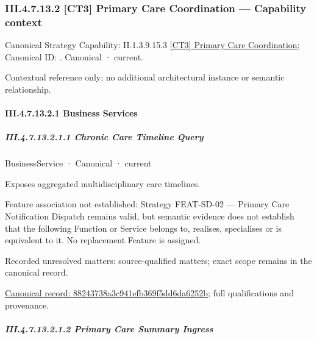 \subsubsection*{III.4.7.13.2 [CT3] Primary Care Coordination — Capability context}
\label{navigation:III.4.7.13.2}

{\small Canonical Strategy Capability: II.1.3.9.15.3 \hyperref[element:f80e73ee91624ce5baa11ae15480fd35]{[CT3] Primary Care Coordination}; Canonical ID: \texttt{}. Canonical · current.}\par
Contextual reference only; no additional architectural instance or semantic relationship.\par
\paragraph*{III.4.7.13.2.1 Business Services}
\label{navigation:III.4.7.13.2.1}

\subparagraph*{III.4.7.13.2.1.1 Chronic Care Timeline Query}
\label{navigation:III.4.7.13.2.1.1}

\label{element:88243738a3c941efb369f5dd6da6252b}
{\small BusinessService · Canonical · current}\par

Exposes aggregated multidisciplinary care timelines.



Feature association not established: Strategy FEAT-SD-02 — Primary Care Notification Dispatch remains valid, but semantic evidence does not establish that the following Function or Service belongs to, realises, specialises or is equivalent to it. No replacement Feature is assigned.


{\small Recorded unresolved matters: source-qualified matters; exact scope remains in the canonical record.}\par
{\footnotesize \href{../../../../continuum/business/business-service/88243738a3c941efb369f5dd6da6252b.md}{Canonical record: 88243738a3c941efb369f5dd6da6252b}; full qualifications and provenance.}\par
\subparagraph*{III.4.7.13.2.1.2 Primary Care Summary Ingress}
\label{navigation:III.4.7.13.2.1.2}

